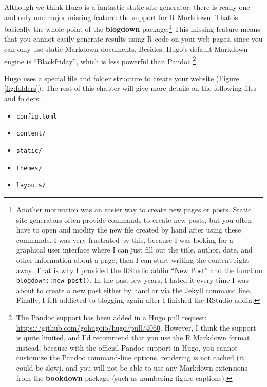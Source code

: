 \documentclass[12pt,]{krantz}
\providecommand{\tightlist}{%
  \setlength{\itemsep}{0pt}\setlength{\parskip}{0pt}}
\theoremstyle{definition}
\theoremstyle{definition}
\theoremstyle{definition}
\theoremstyle{remark}
\begin{document}
Although we think Hugo is a fantastic static site generator, there is
really one and only one major missing feature: the support for R
Markdown. That is basically the whole point of the \textbf{blogdown}
package.\footnote{Another motivation was an easier way to create new
  pages or posts. Static site generators often provide commands to
  create new posts, but you often have to open and modify the new file
  created by hand after using these commands. I was very frustrated by
  this, because I was looking for a graphical user interface where I can
  just fill out the title, author, date, and other information about a
  page, then I can start writing the content right away. That is why I
  provided the RStudio addin ``New Post'' and the function
  \texttt{blogdown::new\_post()}. In the past few years, I hated it
  every time I was about to create a new post either by hand or via the
  Jekyll command line. Finally, I felt addicted to blogging again after
  I finished the RStudio addin.} This missing feature means that you
cannot easily generate results using R code on your web pages, since you
can only use static Markdown documents. Besides, Hugo's default Markdown
engine is ``Blackfriday'', which is less powerful than Pandoc.\footnote{The
  Pandoc support has been added in a Hugo pull request:
  \url{https://github.com/gohugoio/hugo/pull/4060}. However, I think the
  support is quite limited, and I'd recommend that you use the R
  Markdown format instead, because with the official Pandoc support in
  Hugo, you cannot customize the Pandoc command-line options, rendering
  is not cached (it could be slow), and you will not be able to use any
  Markdown extensions from the \textbf{bookdown} package (such as
  numbering figure captions).}

Hugo uses a special file and folder structure to create your website
(Figure \ref{fig:folders}). The rest of this chapter will give more
details on the following files and folders:

\begin{itemize}
\tightlist
\item
  \texttt{config.toml}
\item
  \texttt{content/}
\item
  \texttt{static/}
\item
  \texttt{themes/}
\item
  \texttt{layouts/}
\end{itemize}
\end{document}

